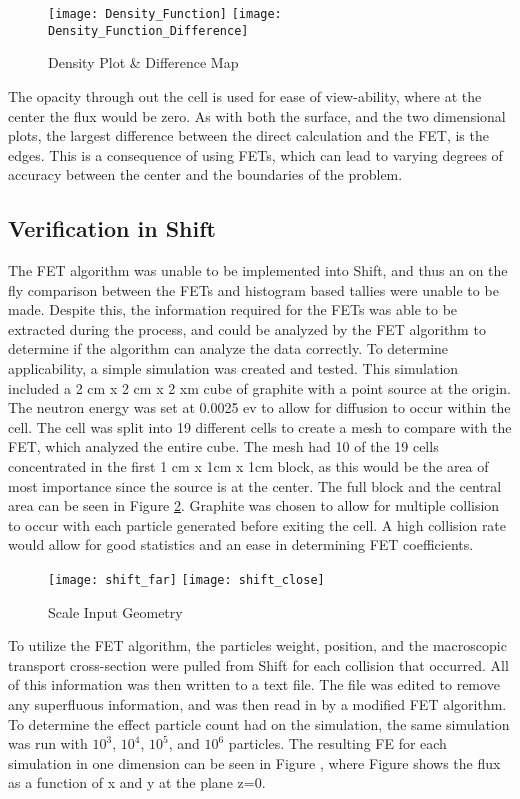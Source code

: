 \documentclass[10tma4paper]{article}
\begin{document}
\begin{figure}[!htbp]
	\caption{Density Plot \& Difference Map}
	\begin{center}
		\texttt{[image: Density\_Function]}
		\texttt{[image: Density\_Function\_Difference]}
	\end{center}
	\label{Density Plot}
\end{figure}
The opacity through out the cell is used for ease of view-ability, where at the center the flux would be zero. As with both the surface, and the two dimensional plots, the largest difference between the direct calculation and the FET, is the edges. This is a consequence of using FETs, which can lead to varying degrees of accuracy between the center and the boundaries of the problem.

\subsection{Verification in Shift}\label{P2}
The FET algorithm was unable to be implemented into Shift, and thus an on the fly comparison between the FETs and histogram based tallies were unable to be made. Despite this, the information required for the FETs was able to be extracted during the process, and could be analyzed by the FET algorithm to determine if the algorithm can analyze the data correctly. To determine applicability, a simple simulation was created and tested. This simulation included a 2 cm x 2 cm x 2 xm cube of graphite with a point source at the origin. The neutron energy was set at 0.0025 ev to allow for diffusion to occur within the cell. The cell was split into 19 different cells to create a mesh to compare with the FET, which analyzed the entire cube. The mesh had 10 of the 19 cells concentrated in the first 1 cm x 1cm x 1cm block, as this would be the area of most importance since the source is at the center. The full block and the central area can be seen in Figure \ref{ScaleRef}. Graphite was chosen to allow for multiple collision to occur with each particle generated before exiting the cell. A high collision rate would allow for good statistics and an ease in determining FET coefficients. 


\begin{figure}[!htbp]
	\caption{Scale Input Geometry}
	\begin{center}
		\texttt{[image: shift\_far]}
		\texttt{[image: shift\_close]}
	\end{center}
	\label{ScaleRef}
\end{figure}
To utilize the FET algorithm, the particles weight, position, and the macroscopic transport cross-section were pulled from Shift for each collision that occurred. All of this information was then written to a text file. The file was edited to remove any superfluous information, and was then read in by a modified FET algorithm.
To determine the effect particle count had on the simulation, the same simulation was run with $10^3$, $10^4$, $10^5$, and $10^6$ particles. The resulting FE for each simulation in one dimension can be seen in Figure , where Figure shows the flux as a function of x and y at the plane z=0.
\end{document}
